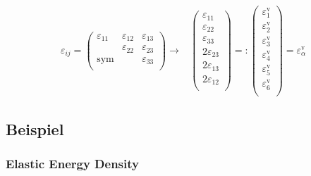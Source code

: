\documentclass[a4paper, 10pt]{scrartcl}
\begin{document}
\begin{align} \varepsilon_{ij}= \begin{pmatrix} \varepsilon_{11} &
		\varepsilon_{12} & \varepsilon_{13} \\ & \varepsilon_{22} & \varepsilon_{23} \\
		\text{sym} & & \varepsilon_{33} \\ \end{pmatrix} \longrightarrow &
	\begin{pmatrix} \varepsilon_{11} \\ \varepsilon_{22} \\ \varepsilon_{33} \\ 2 
		\varepsilon_{23} \\ 2 \varepsilon_{13} \\ 2 \varepsilon_{12} \\ \end{pmatrix} =
	: \begin{pmatrix} \varepsilon^{\text{v}}_{1} \\ \varepsilon^{\text{v}}_{2} \\
		\varepsilon^{\text{v}}_{3} \\ \varepsilon^{\text{v}}_{4} \\
		\varepsilon^{\text{v}}_{5} \\ \varepsilon^{\text{v}}_{6} \\ \end{pmatrix} = 
	\varepsilon^{\text{v}}_\alpha \end{align}

\subsection{Beispiel}

\subsubsection{Elastic Energy Density} %
\end{document}
